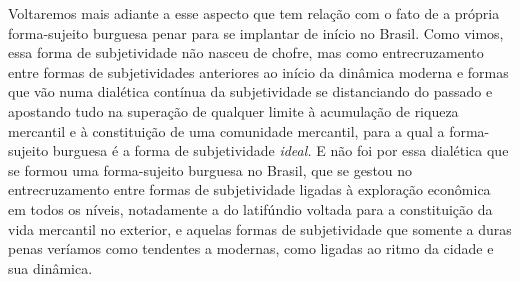 Voltaremos mais adiante a esse aspecto que tem relação com o fato de a
própria forma-sujeito burguesa penar para se implantar de início no
Brasil. Como vimos, essa forma de subjetividade não nasceu de chofre,
mas como entrecruzamento entre formas de subjetividades anteriores ao
início da dinâmica moderna e formas que vão numa dialética contínua da
subjetividade se distanciando do passado e apostando tudo na superação
de qualquer limite à acumulação de riqueza mercantil e à constituição de
uma comunidade mercantil, para a qual a forma-sujeito burguesa é a forma
de subjetividade \emph{ideal.} E não foi por essa dialética que se
formou uma forma-sujeito burguesa no Brasil, que se gestou no
entrecruzamento entre formas de subjetividade ligadas à exploração
econômica em todos os níveis, notadamente a do latifúndio voltada para a
constituição da vida mercantil no exterior, e aquelas formas de
subjetividade que somente a duras penas veríamos como tendentes a
modernas, como ligadas ao ritmo da cidade e sua dinâmica.

